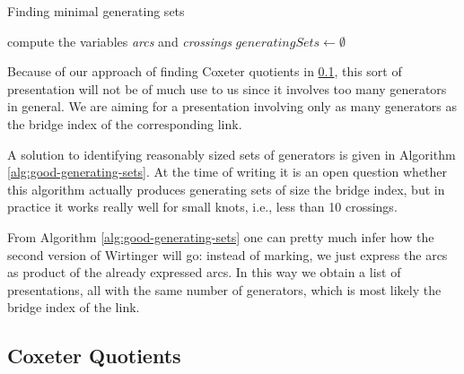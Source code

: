 \documentclass[a4paper]{article}
\theoremstyle{definition}
\begin{document}
\begin{algorithm}\label{alg:good-generating-sets}
\caption{Finding minimal generating sets}
compute the variables \textit{arcs} and \textit{crossings}\;
$\textit{generatingSets} \leftarrow \emptyset$\;
\end{algorithm}


Because of our approach of finding Coxeter quotients in \ref{subsec:coxeter_quotients_algorithms}, this sort of presentation will not be of much use to us since it involves too many generators in general. We are aiming for a presentation involving only as many generators as the bridge index of the corresponding link.

A solution to identifying reasonably sized sets of generators is given in Algorithm \ref{alg:good-generating-sets}. At the time of writing it is an open question whether this algorithm actually produces generating sets of size the bridge index, but in practice it works really well for small knots, i.e., less than 10 crossings.

From Algorithm \ref{alg:good-generating-sets} one can pretty much infer how the second version of Wirtinger will go: instead of marking, we just express the arcs as product of the already expressed arcs. In this way we obtain a list of presentations, all with the same number of generators, which is most likely the bridge index of the link.

\subsection{Coxeter Quotients}\label{subsec:coxeter_quotients_algorithms}
\end{document}
